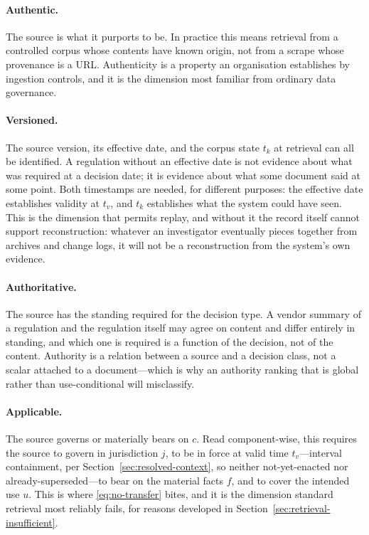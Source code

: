 \documentclass[11pt]{article}
\theoremstyle{plain}
\theoremstyle{definition}
\begin{document}
\paragraph{Authentic.} The source is what it purports to be. In practice this means
retrieval from a controlled corpus whose contents have known origin, not from a
scrape whose provenance is a URL. Authenticity is a property an organisation
establishes by ingestion controls, and it is the dimension most familiar from
ordinary data governance.

\paragraph{Versioned.} The source version, its effective date, and the corpus state
$t_k$ at retrieval can all be identified. A regulation without an effective date is
not evidence about what was required at a decision date; it is evidence about what
some document said at some point. Both timestamps are needed, for different purposes:
the effective date establishes validity at $t_v$, and $t_k$ establishes what the
system could have seen. This is the dimension that permits replay, and without it the record itself cannot
support reconstruction: whatever an investigator eventually pieces together from
archives and change logs, it will not be a reconstruction from the system's own
evidence.

\paragraph{Authoritative.} The source has the standing required for the decision
type. A vendor summary of a regulation and the regulation itself may agree on
content and differ entirely in standing, and which one is required is a function of
the decision, not of the content. Authority is a relation between a source and a
decision class, not a scalar attached to a document---which is why an authority
ranking that is global rather than use-conditional will misclassify.

\paragraph{Applicable.} The source governs or materially bears on $c$. Read
component-wise, this requires the source to govern in jurisdiction $j$, to be in force
at valid time $t_v$---interval containment, per
Section~\ref{sec:resolved-context}, so neither not-yet-enacted nor
already-superseded---to bear on the material facts $f$, and to cover the intended use
$u$. This is where \eqref{eq:no-transfer} bites, and it is the dimension standard
retrieval most reliably fails, for reasons developed in
Section~\ref{sec:retrieval-insufficient}.
\end{document}
